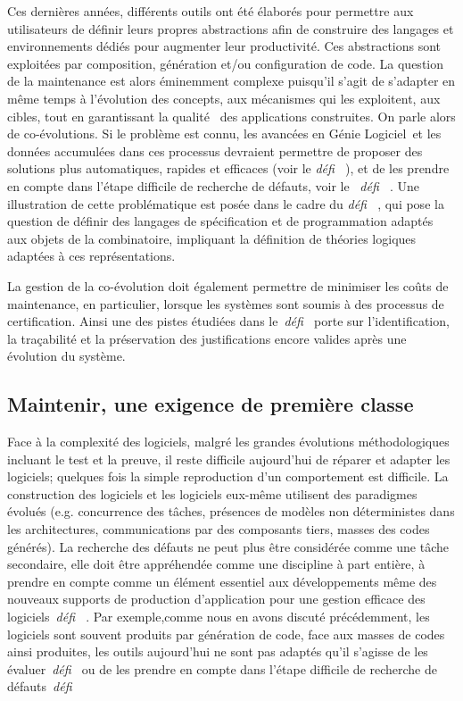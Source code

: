 \documentclass[11pt]{article}
\newcommand{\GL}[0]{Génie Logiciel~}
\newcommand{\defi}[1]{\emph{défi~%
\cite{#1}}}
\begin{document}
Ces dernières années, différents outils ont été élaborés pour permettre aux utilisateurs de définir leurs  propres abstractions afin de construire des langages et environnements dédiés pour augmenter leur productivité. Ces abstractions sont exploitées par composition, génération et/ou configuration de code. La question de la maintenance est alors éminemment complexe puisqu'il s'agit de s'adapter en même temps à l'évolution des concepts, aux mécanismes qui les exploitent, aux cibles, tout en garantissant la \og qualité \fg~des applications construites. On parle alors de co-évolutions. Si le problème est connu, les avancées en \GL et les données accumulées dans ces processus devraient permettre de proposer des solutions plus automatiques, rapides et efficaces (voir le \defi{coevolution}), et de les prendre en compte dans l'étape difficile de recherche de défauts,  voir le 
~\defi{debuggers}. Une illustration de cette problématique est posée dans le cadre du \defi{combinatoire}, qui pose la question de définir des langages de spécification et de programmation adaptés aux objets de la combinatoire, impliquant la définition de théories logiques adaptées à ces représentations.


La gestion de la co-évolution doit également permettre de minimiser les coûts de maintenance, en particulier, lorsque les systèmes sont soumis à des processus de certification. Ainsi une des pistes étudiées dans le~\defi{argumentation} porte sur l'identification, la traçabilité et la préservation des justifications encore valides après une évolution du système. 



\subsection{Maintenir, une exigence de première classe \label{ss:maintenance:debugger}}
Face à la complexité des logiciels, malgré les grandes évolutions méthodologiques incluant le test et la preuve, il reste difficile aujourd'hui de réparer et adapter les logiciels; quelques fois la simple reproduction d'un comportement est difficile. 
La construction des logiciels et les 
logiciels eux-même utilisent des paradigmes évolués (e.g. concurrence des tâches, présences de modèles  non déterministes dans les architectures, communications par des composants tiers, masses des codes générés). 
La  recherche des défauts ne peut plus être considérée comme une tâche secondaire, elle doit être appréhendée comme une discipline à part entière, à prendre en compte comme un élément essentiel aux développements même des nouveaux supports de production d'application pour une gestion efficace des logiciels~\defi{debuggers}.
Par exemple,comme nous en avons discuté précédemment, les logiciels sont souvent produits par génération de code, face aux masses de codes ainsi produites, les outils aujourd'hui ne sont pas adaptés qu'il s'agisse de les évaluer~\defi{coevolution} ou de les prendre en compte dans l'étape difficile de recherche de défauts~\defi{debuggers}
\end{document}
